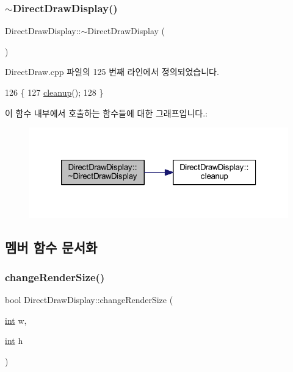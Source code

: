 \subsubsection{\texorpdfstring{$\sim$\+Direct\+Draw\+Display()}{~DirectDrawDisplay()}}
{\footnotesize\ttfamily Direct\+Draw\+Display\+::$\sim$\+Direct\+Draw\+Display (\begin{DoxyParamCaption}{ }\end{DoxyParamCaption})\hspace{0.3cm}{\ttfamily [virtual]}}



Direct\+Draw.\+cpp 파일의 125 번째 라인에서 정의되었습니다.


\begin{DoxyCode}
126 \{
127   \mbox{\hyperlink{class_direct_draw_display_a9ef5e33d516c118742d7cf3b52ed28fc}{cleanup}}();
128 \}
\end{DoxyCode}
이 함수 내부에서 호출하는 함수들에 대한 그래프입니다.\+:
\nopagebreak
\begin{figure}[H]
\begin{center}
\leavevmode
\includegraphics[width=320pt]{class_direct_draw_display_aa0649f887a0adb27964a13b9f1c5e059_cgraph}
\end{center}
\end{figure}


\subsection{멤버 함수 문서화}
\mbox{\label{class_direct_draw_display_a4e91a6dc8d9e32c8f26d11e3879bc850}} 
\subsubsection{\texorpdfstring{change\+Render\+Size()}{changeRenderSize()}}
{\footnotesize\ttfamily bool Direct\+Draw\+Display\+::change\+Render\+Size (\begin{DoxyParamCaption}\item[{\mbox{\hyperlink{_util_8cpp_a0ef32aa8672df19503a49fab2d0c8071}{int}}}]{w,  }\item[{\mbox{\hyperlink{_util_8cpp_a0ef32aa8672df19503a49fab2d0c8071}{int}}}]{h }\end{DoxyParamCaption})\hspace{0.3cm}{\ttfamily [virtual]}}



